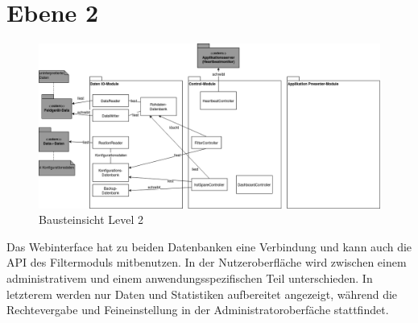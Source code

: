 \section{Ebene 2}
\begin{figure}[h]
	\centering
	\includegraphics[width=1\textwidth]{Graphics/bausteinansicht_ebene_2.png}
	\caption{Bausteinsicht Level 2}
	\label{fig:bausteinsichtlvl2}
\end{figure}
Das Webinterface hat zu beiden Datenbanken eine Verbindung und kann auch die API des Filtermoduls mitbenutzen. In der Nutzeroberfläche wird zwischen einem administrativem und einem anwendungsspezifischen Teil unterschieden. In letzterem werden nur Daten und Statistiken aufbereitet angezeigt, während die Rechtevergabe und Feineinstellung in der Administratoroberfäche stattfindet. 